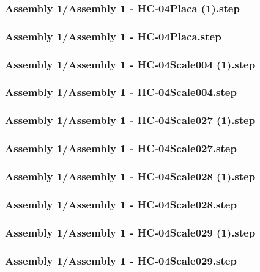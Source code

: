 \documentclass[a4paper,12pt]{article}
\begin{document}
\subsubsection{Assembly 1/Assembly 1 - HC-04Placa (1).step}

\subsubsection{Assembly 1/Assembly 1 - HC-04Placa.step}

\subsubsection{Assembly 1/Assembly 1 - HC-04Scale004 (1).step}

\subsubsection{Assembly 1/Assembly 1 - HC-04Scale004.step}

\subsubsection{Assembly 1/Assembly 1 - HC-04Scale027 (1).step}

\subsubsection{Assembly 1/Assembly 1 - HC-04Scale027.step}

\subsubsection{Assembly 1/Assembly 1 - HC-04Scale028 (1).step}

\subsubsection{Assembly 1/Assembly 1 - HC-04Scale028.step}

\subsubsection{Assembly 1/Assembly 1 - HC-04Scale029 (1).step}

\subsubsection{Assembly 1/Assembly 1 - HC-04Scale029.step}

\end{document}
